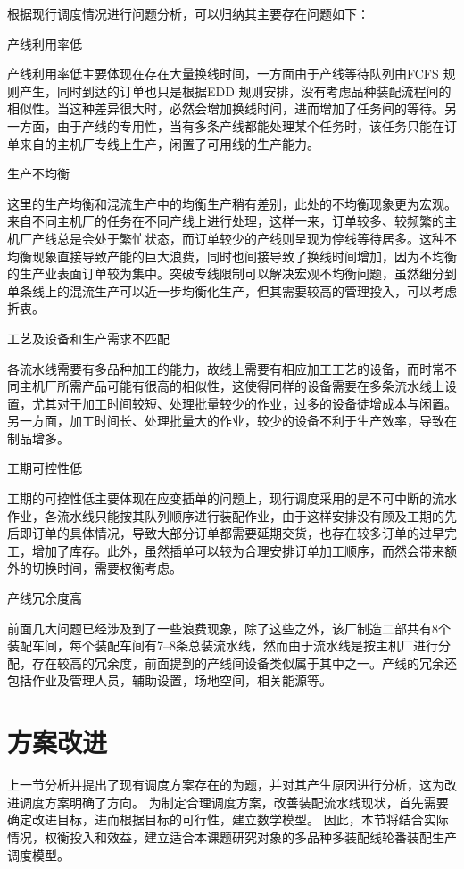 根据现行调度情况进行问题分析，可以归纳其主要存在问题如下：
\renewcommand{\labelenumi}{(\theenumi)}
\begin{asparaenum}
\item 产线利用率低

产线利用率低主要体现在存在大量换线时间，一方面由于产线等待队列由FCFS 规则产生，同时到达的订单也只是根据EDD 规则安排，没有考虑品种装配流程间的相似性。当这种差异很大时，必然会增加换线时间，进而增加了任务间的等待。另一方面，由于产线的专用性，当有多条产线都能处理某个任务时，该任务只能在订单来自的主机厂专线上生产，闲置了可用线的生产能力。
\item 生产不均衡

这里的生产均衡和混流生产中的均衡生产稍有差别，此处的不均衡现象更为宏观。来自不同主机厂的任务在不同产线上进行处理，这样一来，订单较多、较频繁的主机厂产线总是会处于繁忙状态，而订单较少的产线则呈现为停线等待居多。这种不均衡现象直接导致产能的巨大浪费，同时也间接导致了换线时间增加，因为不均衡的生产业表面订单较为集中。突破专线限制可以解决宏观不均衡问题，虽然细分到单条线上的混流生产可以近一步均衡化生产，但其需要较高的管理投入，可以考虑折衷。
\item 工艺及设备和生产需求不匹配

各流水线需要有多品种加工的能力，故线上需要有相应加工工艺的设备，而时常不同主机厂所需产品可能有很高的相似性，这使得同样的设备需要在多条流水线上设置，尤其对于加工时间较短、处理批量较少的作业，过多的设备徒增成本与闲置。另一方面，加工时间长、处理批量大的作业，较少的设备不利于生产效率，导致在制品增多。
\item 工期可控性低

工期的可控性低主要体现在应变插单的问题上，现行调度采用的是不可中断的流水作业，各流水线只能按其队列顺序进行装配作业，由于这样安排没有顾及工期的先后即订单的具体情况，导致大部分订单都需要延期交货，也存在较多订单的过早完工，增加了库存。此外，虽然插单可以较为合理安排订单加工顺序，而然会带来额外的切换时间，需要权衡考虑。
\item 产线冗余度高
\end{asparaenum}

前面几大问题已经涉及到了一些浪费现象，除了这些之外，该厂制造二部共有8个装配车间，每个装配车间有7--8条总装流水线，然而由于流水线是按主机厂进行分配，存在较高的冗余度，前面提到的产线间设备类似属于其中之一。产线的冗余还包括作业及管理人员，辅助设置，场地空间，相关能源等。

\section{方案改进}
上一节分析并提出了现有调度方案存在的为题，并对其产生原因进行分析，这为改进调度方案明确了方向。
为制定合理调度方案，改善装配流水线现状，首先需要确定改进目标，进而根据目标的可行性，建立数学模型。
因此，本节将结合实际情况，权衡投入和效益，建立适合本课题研究对象的多品种多装配线轮番装配生产调度模型。
